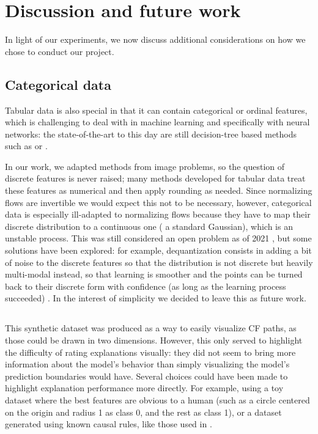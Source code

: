 \documentclass[../main.tex]{subfiles}
\begin{document}
\chapter{Discussion and future work}
\label{ch:discussion}

In light of our experiments, we now discuss additional considerations on how we chose to conduct our project.

\section{Categorical data}

Tabular data is also special in that it can contain categorical or ordinal features, which is challenging to deal with in machine learning and specifically with neural networks: the state-of-the-art to this day are still decision-tree based methods such as  \cite{chenXGBoost2016} or  \cite{prokhorenkovaCatBoost2018}.

In our work, we adapted methods from image problems, so the question of discrete features is never raised; many methods developed for tabular data treat these features as numerical and then apply rounding as needed.
Since normalizing flows are invertible we would expect this not to be necessary, however, categorical data is especially ill-adapted to normalizing flows because they have to map their discrete distribution to a continuous one (\eg{} a standard Gaussian), which is an unstable process.
This was still considered an open problem as of 2021 \cite{kobyzevNormalizing2021}, but some solutions have been explored:
for example, dequantization consists in adding a bit of noise to the discrete features so that the distribution is not discrete but heavily multi-modal instead, so that learning is smoother and the points can be turned back to their discrete form with confidence (as long as the learning process succeeded) \cite{hoFlow2019}.
In the interest of simplicity we decided to leave this as future work.

\section{\CakeOnSea}

This synthetic dataset was produced as a way to easily visualize CF paths, as those could be drawn in two dimensions.
However, this only served to highlight the difficulty of rating explanations visually: they did not seem to bring more information about the model's behavior than simply visualizing the model's prediction boundaries would have.
Several choices could have been made to highlight explanation performance more directly.
For example, using a toy dataset where the best features are obvious to a human (such as a circle centered on the origin and radius 1 as class 0, and the rest as class 1), or a dataset generated using known causal rules, like those used in \cite{karimiAlgorithmic2020}.
\end{document}
